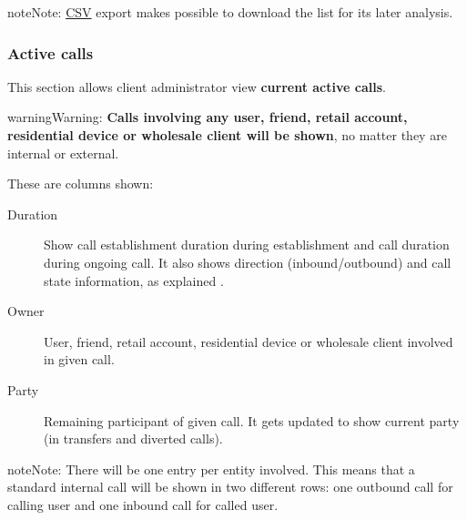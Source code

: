 \documentclass[letterpaper,10pt,english]{sphinxmanual}
\begin{document}
\begin{notice}{note}{Note:}
\href{https://es.wikipedia.org/wiki/CSV}{CSV} export makes possible to
download the list for its later analysis.
\end{notice}


\subsubsection{Active calls}
\label{administration_portal/client/vpbx/calls/active_calls::doc}\label{administration_portal/client/vpbx/calls/active_calls:active-calls}
This section allows client administrator view \textbf{current active calls}.

\begin{notice}{warning}{Warning:}
\textbf{Calls involving any user, friend, retail account, residential device or wholesale client will be shown},
no matter they are internal or external.
\end{notice}

These are columns shown:
\begin{description}
\item[{Duration}] \leavevmode{}\label{administration_portal/client/vpbx/calls/active_calls:term-duration}
Show call establishment duration during establishment and call duration during ongoing call. It also shows
direction (inbound/outbound) and call state information, as explained {\hyperref[administration_portal/platform/active_calls:call\string-state]{}}.

\item[{Owner}] \leavevmode{}\label{administration_portal/client/vpbx/calls/active_calls:term-owner}
User, friend, retail account, residential device or wholesale client involved in given call.

\item[{Party}] \leavevmode{}\label{administration_portal/client/vpbx/calls/active_calls:term-party}
Remaining participant of given call. It gets updated to show current party (in transfers and diverted calls).

\end{description}

\begin{notice}{note}{Note:}
There will be one entry per entity involved. This means that a standard internal call will be shown
in two different rows: one outbound call for calling user and one inbound call for called user.
\end{notice}
\end{document}
